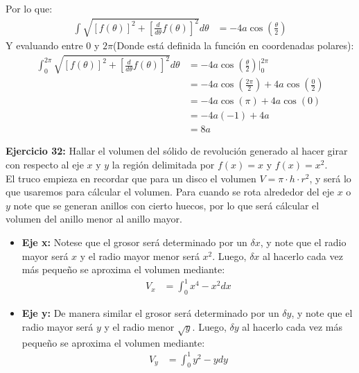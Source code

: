 \documentclass[../main.tex]{subfiles}
\begin{document}
    Por lo que:
    \begin{align*}
        \int \sqrt{\left[f(\theta)\right]^2+\left[\frac{d}{d\theta} f(\theta)\right]^2} d\theta &= -4a  \cos\left(\frac{\theta}{2}\right)
    \end{align*}
    Y evaluando entre $0$ y $2\pi$(Donde está definida la función en coordenadas polares):
    \begin{align*}
        \int_0^{2\pi} \sqrt{\left[f(\theta)\right]^2+\left[\frac{d}{d\theta} f(\theta)\right]^2} d\theta &= -4a  \cos\left(\frac{\theta}{2}\right) |_{0}^{2\pi}\\
        &= -4a  \cos\left(\frac{2\pi}{2}\right) + 4a  \cos\left(\frac{0}{2}\right)\\
        &= -4a  \cos\left(\pi\right) + 4a  \cos\left(0\right)\\
        &= -4a  (-1) + 4a \\
        &= 8a
    \end{align*}

    \question \textbf{Ejercicio 32:} Hallar el volumen del sólido de revolución generado al hacer girar con respecto al eje $x$ y $y$ la región delimitada por $f(x) = x$ y $f(x) = x^2$.\\

    El truco empieza en recordar que para un disco el volumen $V = \pi \cdot h \cdot r^2$, y será lo que usaremos para cálcular el volumen. Para cuando se rota alrededor del eje $x$ o $y$ note que se generan anillos con cierto huecos, por lo que será cálcular el volumen del anillo menor al anillo mayor. 
    \begin{itemize}
        \item \textbf{Eje x:} Notese que el grosor será determinado por un $\delta x$, y note que el radio mayor será $x$ y el radio mayor menor será $x^2$. Luego, $\delta x$ al hacerlo cada vez más pequeño se aproxima el volumen mediante:
        \begin{align*}
            V_x &= \int_0^1 x^4 - x^2 dx
        \end{align*}

        \item \textbf{Eje y:} De manera similar el grosor será determinado por un $\delta y$, y note que el radio mayor será $y$ y el radio menor $\sqrt{y}$. Luego, $\delta y$ al hacerlo cada vez más pequeño se aproxima el volumen mediante:
        \begin{align*}
            V_y &= \int_0^1 y^2-y dy
        \end{align*}
    \end{itemize}
\end{document}
